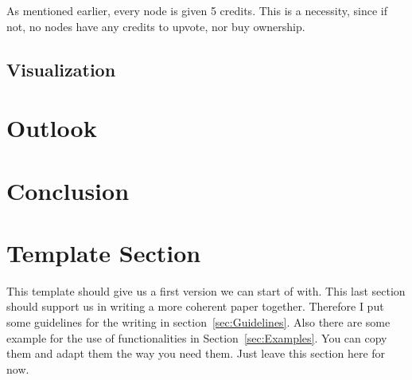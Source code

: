 \documentclass[12pt]{article}
\begin{document}
As mentioned earlier, every node is given 5 credits. This is a
necessity, since if not, no nodes have any credits to upvote, nor buy
ownership.

\subsection{Visualization} %


\section{Outlook} \label{sec:Outlook} %

\section{Conclusion} \label{sec:Conclusion} %



\section{Template Section} \label{sec:Template}
    This template should give us a first version we can start of with. This last section should support us in writing a more coherent paper together. Therefore I put some guidelines for the writing in section~\ref{sec:Guidelines}. Also there are some example for the use of functionalities in Section~\ref{sec:Examples}. You can copy them and adapt them the way you need them. Just leave this section here for now.
\end{document}
